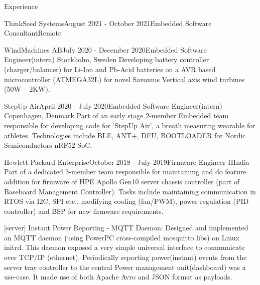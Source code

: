 \documentclass[
	a4paper, %
	11pt, %
]{resume} %
\begin{document}
\begin{rSection}{Experience}
\begin{rSubsection}{ThinkSeed Systems}{August 2021 - October 2021}{Embedded Software Consultant}{Remote}
		
	\end{rSubsection}


	\begin{rSubsection}{WindMachines AB}{July 2020 - December 2020}{Embedded Software Engineer(intern)}{ Stockholm, Sweden}
            Developing battery controller (charger/balancer) for Li-Ion and Pb-Acid batteries on a AVR based microcontroller (ATMEGA32L) for novel Savonius Vertical axis wind turbines (50W – 2KW).

	\end{rSubsection}
 

	\begin{rSubsection}{StepUp Air}{April 2020 - July 2020}{Embedded Software Engineer(intern)}{ Copenhagen, Denmark}
            Part of an early stage 2-member Embedded team responsible for developing code for ‘StepUp Air’, a breath measuring wearable for athletes. Technologies include BLE, ANT+, DFU, BOOTLOADER for Nordic Semiconductors nRF52 SoC.

	\end{rSubsection}
 

	\begin{rSubsection}{Hewlett-Packard Enterprise}{October 2018 - July 2019}{Firmware Engineer II}{India}
            Part of a dedicated 3-member team responsible for maintaining and do feature addition for firmware of HPE Apollo Gen10 server chassis controller (part of Baseboard Management Controller). Tasks include maintaining communication in RTOS via I2C, SPI etc., modifying cooling (fan/PWM), power regulation (PID controller) and BSP for new firmware requirements.

            [server] Instant Power Reporting - MQTT Daemon: Designed and implemented an MQTT daemon (using PowerPC cross-compiled mosquitto libs) on Linux initrd. This daemon exposed a very simple universal interface to communicate over TCP/IP (ethernet). Periodically reporting power(instant) events from the server tray controller to the central Power management unit(dashboard) was a use-case. It made use of both Apache Avro and JSON format as payloads.
            

\end{rSubsection}
\end{rSection}
\end{document}
